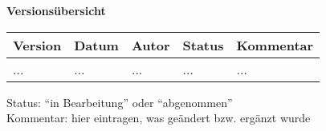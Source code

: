 
{\textbf{Versions\"ubersicht}}\\[2ex]

\begin{longtable}{|m{1.78cm}|m{1.59cm}|m{2.86cm}|m{1.9cm}|m{5.25cm}|}

  \hline                                              %

  \textbf{Version}  &    \textbf{Datum}  &    \textbf{Autor}  &
  \textbf{Status}   &    \textbf{Kommentar}  \\       %
  \hline                                              %

  ...    &    ...    &    ...    &    ...    &    ...\\       %
  \hline                                              %

\end{longtable}
Status: "`in Bearbeitung"' oder "`abgenommen"'\\
Kommentar: hier eintragen, was ge\"andert bzw. erg\"anzt wurde

